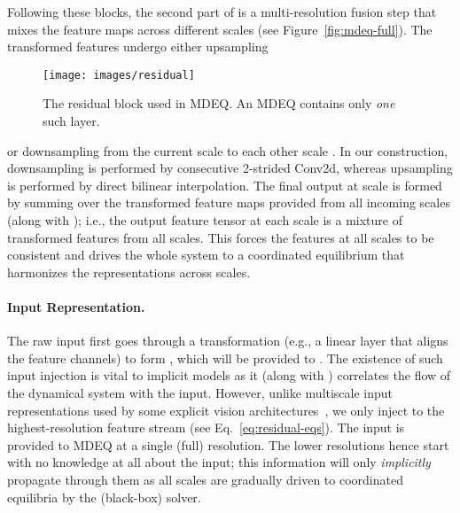 \documentclass{article}
\begin{document}
Following these blocks, the second part of  is a multi-resolution fusion step that mixes the feature maps across different scales (see Figure~\ref{fig:mdeq-full}). The transformed features  undergo either upsampling
\begin{wrapfigure}{r}{0.49\textwidth}
  \vspace{-.05in}
  \begin{center}
    \texttt{[image: images/residual]}
  \end{center}
  \vspace{-.08in}
  \caption{The residual block used in MDEQ. An MDEQ contains only \emph{one} such layer.}
  \label{fig:mdeq-residual-block}
  \vspace{-.11in}
\end{wrapfigure}
or downsampling from the current scale  to each other scale .
In our construction, downsampling is performed by  consecutive 2-strided  Conv2d, whereas upsampling is performed by direct bilinear interpolation. The final output at scale  is formed by summing over the transformed feature maps provided from all incoming scales  (along with ); i.e., the output feature tensor at each scale is a mixture of transformed features from all scales. This forces the features at all scales to be consistent and drives the whole system to a coordinated equilibrium that harmonizes the representations across scales.

\vspace{-.1in}
\paragraph{Input Representation.} The raw input first goes through a transformation (e.g., a linear layer that aligns the feature channels) to form , which will be provided to . The existence of such input injection is vital to implicit models as it (along with ) correlates the flow of the dynamical system with the input. However, unlike multiscale input representations used by some explicit vision architectures~\cite{farabet2012learning,chen2017deeplab}, we only inject  to the highest-resolution feature stream (see Eq.~\eqref{eq:residual-eqs}). The input is provided to MDEQ at a single (full) resolution. The lower resolutions hence start with no knowledge at all about the input; this information will only \emph{implicitly} propagate through them as all scales are gradually driven to coordinated equilibria  by the (black-box) solver.


\vspace{-.1in}
\end{document}
